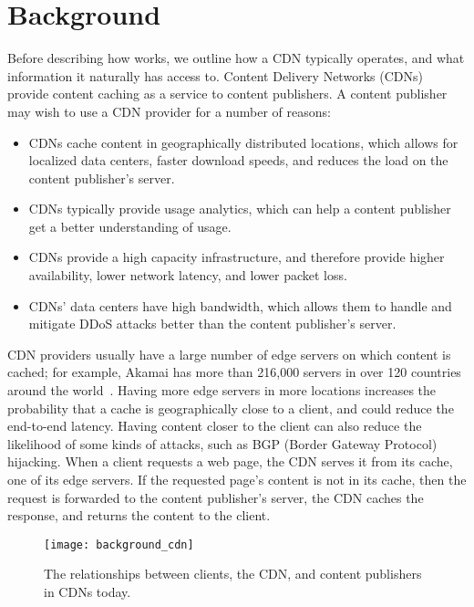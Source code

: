 \section{Background}
\label{sec:background}
Before describing how \system{} works, we outline how a CDN typically operates, and what information 
it naturally has access to.  Content Delivery Networks (CDNs) provide content caching as a service to content publishers.  A 
content publisher may wish to use a CDN provider for a number of reasons:

\begin{itemize}
\item CDNs cache content in geographically distributed locations, which allows for localized 
data centers, faster download speeds, and reduces the load on the content publisher's server.
\item CDNs typically provide usage analytics, which can help a content publisher get a better 
understanding of usage.
\item CDNs provide a high capacity infrastructure, and therefore provide higher availability, 
lower network latency, and lower packet loss.  
\item CDNs' data centers have high bandwidth, which allows them to handle and mitigate DDoS attacks better 
than the content publisher's server.
\end{itemize}

CDN providers usually have a large number of edge servers on which content is cached; for example, 
Akamai has more than 216,000 servers in over 120 countries around the world~\cite{akamai_facts}.  
Having more edge servers in more locations increases the probability that a cache is geographically 
close to a client, and could reduce the end-to-end latency.  Having content closer to the client can also 
reduce the likelihood of some kinds of attacks, such as BGP (Border Gateway Protocol) hijacking.  When a client requests a web page, 
the CDN serves it from its cache, one of its edge servers.  If the requested page's content is 
not in its cache, then the request is forwarded to the content publisher's server, the CDN 
caches the response, and returns the content to the client. 

\begin{figure}[h]
\centering
\texttt{[image: background\_cdn]}
\caption{The relationships between clients, the CDN, and content publishers in 
CDNs today.}
\label{fig:basic_cdn}
\end{figure}

